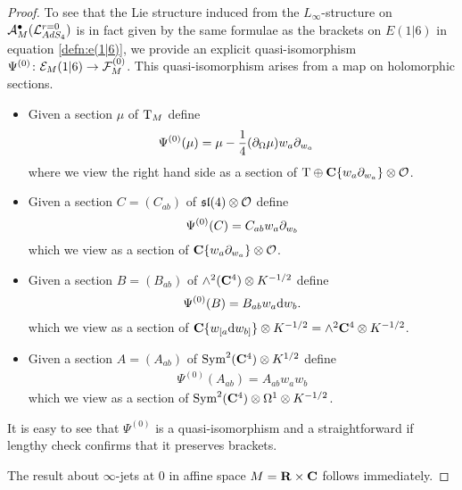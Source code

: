 \documentclass[../main.tex]{subfiles}
\begin{document}
\begin{proof}
To see that the Lie structure induced from the $L_\infty$-structure on $\mathcal A_M^\bullet (\mathcal{L}^{r=0}_{AdS_4} )$ is in fact given by the same formulae as the brackets on $E(1|6)$ in equation \ref{defn:e(1|6)}, we provide an explicit quasi-isomorphism $\Psi^{(0)} \colon \mathcal{E}_M(1|6) \to \mathcal{F}^{(0)}_{M}$.
This quasi-isomorphism arises from a map on holomorphic sections.

\begin{itemize}
\item Given a section $\mu$ of ${\mathrm{T}}_M$ define
\begin{align*}
\Psi^{(0)} (\mu) &= \mu - \frac 14 (\partial_\Omega \mu) w_a\partial_{w_a} 
\end{align*}
where we view the right hand side as a section of ${\mathrm{T}} \oplus \mathbf{C}\{w_a \partial_{w_a}\} \otimes \mathcal O$.
\item Given a section $C = (C_{ab})$ of $\mathfrak{sl}(4)\otimes \mathcal{O}$ define
\[
\Psi^{(0)} (C) = C_{ab}w_a\partial_{w_b}
\]
which we view as a section of $\mathbf{C}\{w_a \partial_{w_a}\} \otimes \mathcal O$.
\item Given a section $B = (B_{ab})$ of $\wedge^2 (\mathbf{C}^4) \otimes K^{-1/2}$ define
\[
\Psi^{(0)} (B) = B_{ab} w_a \mathrm{d} w_b .
\]
which we view as a section of $\mathbf{C}\{w_{[a} \mathrm{d} w_{b]}\} \otimes K^{-1/2} = \wedge^2 \mathbf{C}^4 \otimes K^{-1/2}$.
\item Given a section 
$A=(A_{ab})$ of $\text{Sym}^2 (\mathbf{C}^4) \otimes K^{1/2}$ define
\begin{align*}
\Psi^{(0)} (A_{ab}) = A_{ab} w_a w_b 
\end{align*}
which we view as a section of $\text{Sym}^2 (\mathbf{C}^4) \otimes \Omega^1 \otimes K^{-1/2}$.
\end{itemize}
It is easy to see that $\Psi^{(0)}$ is a quasi-isomorphism and a straightforward if lengthy check confirms that it preserves brackets. 

The result about $\infty$-jets at $0$ in affine space $M = \mathbf{R} \times \mathbf{C}$ follows immediately.
\end{proof}

\end{document}
